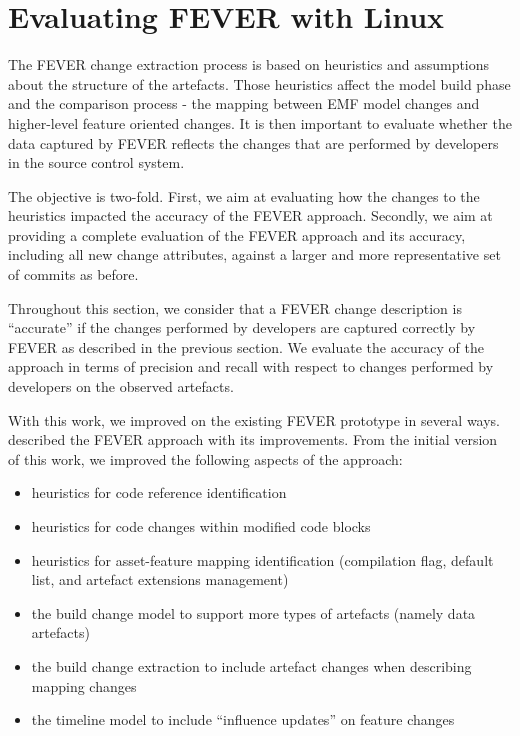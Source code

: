 
\section{Evaluating FEVER with Linux}
\label{sec:evaluation}

The FEVER change extraction process is based on heuristics and assumptions about the structure of the artefacts. 
Those heuristics affect the model build phase and the comparison process - the mapping between EMF model changes and higher-level
feature oriented changes. 
It is then important to evaluate whether the data captured by FEVER reflects the changes that are performed by developers
in the source control system. 

The objective is two-fold. First, we aim at evaluating how the changes to the heuristics impacted the accuracy of the FEVER approach.
Secondly, we aim at providing a complete evaluation of the FEVER approach and its accuracy, 
including all new change attributes, against a larger and more representative set of commits as before.

Throughout this section, we consider that a FEVER change description is ``accurate'' if the changes
performed by developers are captured correctly by FEVER as described in the previous section.
We evaluate the accuracy of the approach in terms of precision and recall with respect to changes 
performed by developers on the observed artefacts.

With this work, we improved on the existing FEVER prototype \citep{dintzner_fever:_2016} in several ways.
 described the FEVER approach with its improvements.
From the initial version of this work, we improved the following aspects of the approach:
\begin{itemize}
\item heuristics for code reference identification
\item heuristics for code changes within modified code blocks
\item heuristics for asset-feature mapping identification (compilation flag, default list, and artefact extensions management)
\item the build change model to support more types of artefacts (namely data artefacts)
\item the build change extraction to include artefact changes when describing mapping changes
\item the timeline model to include ``influence updates'' on feature changes
\end{itemize}

